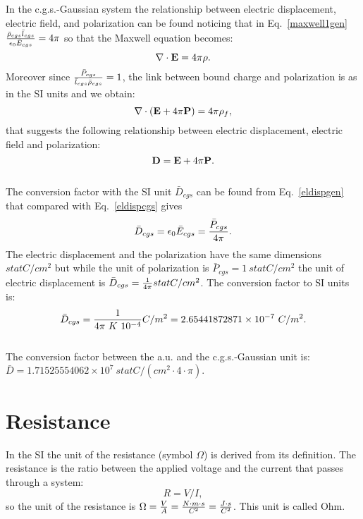 \documentclass[12pt,a4paper]{article}
\def\dtod{2.65441872871\times 10^{-7}}
\def\bardcgs{1.71525554062\times 10^{7}}
\begin{document}
{\color{orange} In the c.g.s.-Gaussian system the relationship
between electric displacement, electric field, and polarization can 
be found noticing that in Eq.~\ref{maxwell1gen}
${\bar \rho_{cgs} \bar l_{cgs} \over \epsilon_0 \bar E_{cgs}}=4\pi$
so that the Maxwell equation becomes:
\begin{equation}
\nabla \cdot {\bf E} = 4 \pi \rho.
\end{equation}
Moreover since ${\bar P_{cgs} \over \bar l_{cgs} \bar \rho_{cgs}}=1$,
the link between bound charge and polarization is as in the SI units and
we obtain:
\begin{equation}
\nabla \cdot ({\bf E}+ 4 \pi {\bf P})=4 \pi \rho_f, 
\label{aldispau}
\end{equation}
that suggests the following relationship between electric displacement,
electric field and polarization:
\begin{equation}
{\bf D} =  {\bf E} + 4 \pi {\bf P}.
\label{eldispcgs}
\end{equation}
\\
The conversion factor with the SI unit $\bar D_{cgs}$ can be found
from Eq.~\ref{eldispgen} that compared with Eq.~\ref{eldispcgs} gives
\begin{equation}
\bar D_{cgs}= {\epsilon_0 \bar E_{cgs}}= {\bar P_{cgs} \over 4 \pi}.
\end{equation}
The electric displacement and the polarization 
have the same dimensions $statC/cm^2$ but while the unit of polarization
is $\bar P_{cgs}=1\ statC/cm^2$ the unit of electric displacement 
is $\bar D_{cgs}={1\over 4 \pi} statC/cm^2$.
The conversion factor to SI units is:
\begin{equation}
\bar D_{cgs}= {1\over 4 \pi\ K\ 10^{-4}} C/m^2=\dtod\ C/m^2. 
\end{equation}
}
\\

{\color{green} 
The conversion factor between the a.u. and the c.g.s.-Gaussian unit is: 
$\bar D = \bardcgs \ statC/(cm^2 \cdot 4 \cdot \pi)$.
}

\newpage
\section{\color{coral}Resistance}
In the SI the unit of the resistance (symbol $\Omega$)
is derived from its definition. The resistance is the ratio between 
the applied voltage and the current that passes through a system:
\begin{equation}
R=V/I,
\end{equation}
so the unit of the resistance is $\Omega={V \over A}=
{N\cdot m \cdot s \over C^2}={J\cdot s \over C^2}$. This
unit is called Ohm.
\\
\end{document}
